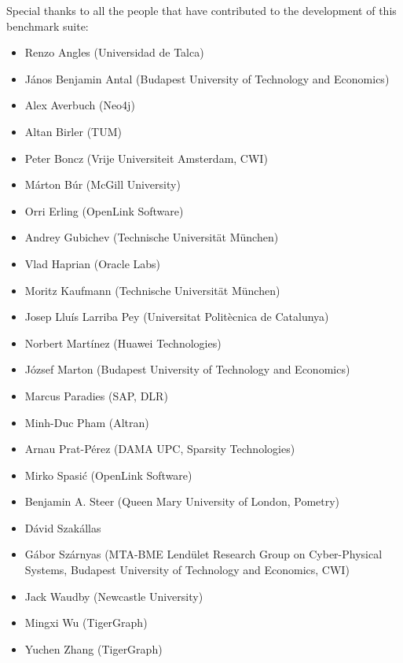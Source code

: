 Special thanks to all the people that have contributed to the development of this benchmark suite:
\begin{itemize}
  \item Renzo Angles (Universidad de Talca)
  \item J\'anos Benjamin Antal (Budapest University of Technology and Economics)
  \item Alex Averbuch (Neo4j)
  \item Altan Birler (TUM)
  \item Peter Boncz (Vrije Universiteit Amsterdam, CWI)
  \item M\'arton B\'ur (McGill University)
  \item Orri Erling (OpenLink Software)
  \item Andrey Gubichev (Technische Universit\"at M\"unchen)
  \item Vlad Haprian (Oracle Labs)
  \item Moritz Kaufmann (Technische Universit\"at M\"unchen)
  \item Josep Llu\'is Larriba Pey (Universitat Polit\`ecnica de Catalunya)
  \item Norbert Mart\'inez (Huawei Technologies)
  \item J\'ozsef Marton (Budapest University of Technology and Economics)
  \item Marcus Paradies (SAP, DLR)
  \item Minh-Duc Pham (Altran)
  \item Arnau Prat-P\'erez (DAMA UPC, Sparsity Technologies)
  \item Mirko Spasi\'c (OpenLink Software)
  \item Benjamin A. Steer (Queen Mary University of London, Pometry)
  \item D\'avid Szak\'allas
  \item G\'abor Sz\'arnyas (MTA-BME Lend\"ulet Research Group on Cyber-Physical Systems, Budapest University of Technology and Economics, CWI)
  \item Jack Waudby (Newcastle University)
  \item Mingxi Wu (TigerGraph)
  \item Yuchen Zhang (TigerGraph)
\end{itemize}
